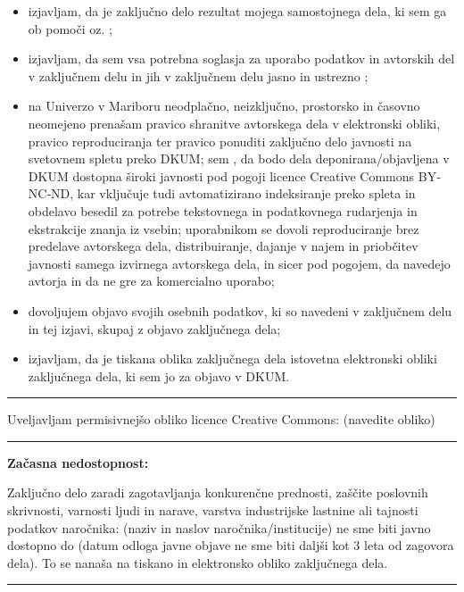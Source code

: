 \pstudentLabelPodpisani{} \pstudentLabel{} \pStudent
\begin{itemize}
    \item izjavljam, da je zaključno delo rezultat mojega samostojnega dela, ki sem ga \pstudentLabelIzdelal{} ob pomoči \pMentorLabelRodilnik{} oz. \pSomentorLabelRodilnik;
    \item izjavljam, da  sem \pstudentLabelPridobil{}  vsa  potrebna  soglasja  za uporabo podatkov in  avtorskih  del v zaključnem delu in jih v zaključnem delu jasno in ustrezno \pstudentLabelOznacil;
    \item na Univerzo v Mariboru neodplačno, neizključno, prostorsko in časovno neomejeno prenašam pravico shranitve avtorskega dela v elektronski obliki, pravico reproduciranja ter pravico ponuditi zaključno delo javnosti na svetovnem spletu  preko  DKUM;  sem \pstudentLabelSeznanjen, da  bodo dela deponirana/objavljena v DKUM dostopna široki javnosti pod pogoji licence Creative Commons BY‐NC‐ND, kar vključuje tudi avtomatizirano indeksiranje preko spleta in obdelavo besedil za potrebe tekstovnega in podatkovnega rudarjenja in ekstrakcije znanja iz vsebin; uporabnikom se dovoli reproduciranje brez predelave avtorskega dela, distribuiranje, dajanje v najem in priobčitev javnosti samega izvirnega avtorskega dela, in sicer pod pogojem, da navedejo avtorja in da ne gre za komercialno uporabo;
    \item dovoljujem objavo svojih osebnih podatkov, ki so navedeni v zaključnem delu in tej izjavi, skupaj z objavo zaključnega dela;
    \item izjavljam, da je tiskana oblika zaključnega dela istovetna elektronski obliki zaključnega dela, ki sem jo \pstudentLabelOddal{} za objavo v DKUM.
\end{itemize}
\bigskip
\hrule
\bigskip
Uveljavljam permisivnejšo obliko licence Creative Commons: \underline{\hspace{2cm}} (navedite obliko)\par
\medskip
\bigskip
\hrule
\bigskip

\textbf{Začasna nedostopnost:}\par

Zaključno delo zaradi zagotavljanja konkurenčne prednosti, zaščite poslovnih skrivnosti, varnosti ljudi in narave, varstva industrijske lastnine ali tajnosti podatkov naročnika: \underline{\hspace{6cm}} (naziv in naslov naročnika/institucije) ne sme biti javno dostopno  do \underline{\hspace{4cm}} (datum odloga javne objave ne sme biti daljši kot 3 leta od zagovora dela). To se nanaša na tiskano in elektronsko obliko zaključnega dela.
\bigskip
\hrule


